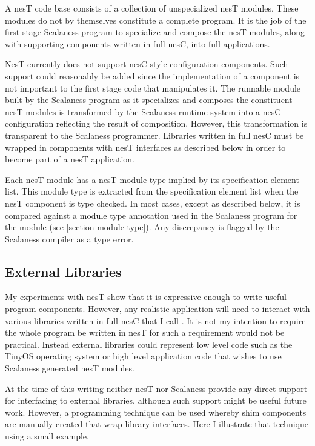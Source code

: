 A nesT code base consists of a collection of unspecialized nesT modules. These modules do not by
themselves constitute a complete program. It is the job of the first stage Scalaness program to
specialize and compose the nesT modules, along with supporting components written in full nesC,
into full applications.


NesT currently does not support nesC-style configuration components. Such support could
reasonably be added since the implementation of a component is not important to the first stage
code that manipulates it. The runnable module built by the Scalaness program as it specializes
and composes the constituent nesT modules is transformed by the Scalaness runtime system into a
nesC configuration reflecting the result of composition. However, this transformation is
transparent to the Scalaness programmer. Libraries written in full nesC must be wrapped in
components with nesT interfaces as described below in order to become part of a nesT
application.

Each nesT module has a nesT module type implied by its specification element list. This module
type is extracted from the specification element list when the nesT component is type checked.
In most cases, except as described below, it is compared against a module type annotation used
in the Scalaness program for the module (see \autoref{section-module-type}). Any discrepancy is
flagged by the Scalaness compiler as a type error.

\subsection{External Libraries}
\label{section-external-libraries}

My experiments with nesT show that it is expressive enough to write useful program components.
However, any realistic application will need to interact with various libraries written in full
nesC that I call . It is not my intention to require the whole
program be written in nesT for such a requirement would not be practical. Instead external
libraries could represent low level code such as the TinyOS operating system or high level
application code that wishes to use Scalaness generated nesT modules.

At the time of this writing neither nesT nor Scalaness provide any direct support for
interfacing to external libraries, although such support might be useful future work. However, a
programming technique can be used whereby shim components are manually created that wrap library
interfaces. Here I illustrate that technique using a small example.

